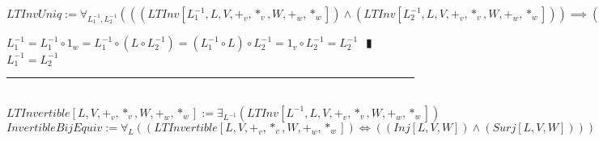 \documentclass{book}
\newcommand{\abr}{:=}
\newcommand{\pipe}{$\phantom{(}\vrectangleblack\phantom{)}$}
\begin{document}
$LTInvUniq \abr \forall_{L_1^{-1}, L_2^{-1}}(((LTInv[L_1^{-1}, L, V, +_v, *_v, W, +_w, *_w]) \land (LTInv[L_2^{-1}, L, V, +_v, *_v, W, +_w, *_w])) \implies (L_1^{-1} = L_2^{-1}))$
\begin{enumerate}
  \lit $L_1^{-1} = L_1^{-1} \circ 1_w = L_1^{-1} \circ (L \circ L_2^{-1}) = (L_1^{-1} \circ L) \circ L_2^{-1} = 1_v \circ L_2^{-1} = L_2^{-1}$ \pipe $L_1^{-1} = L_2^{-1}$
\end{enumerate} \vspace{.75mm} \hrule \vspace{.75mm} \ \\ 

$LTInvertible[L, V, +_v, *_v, W, +_w, *_w] \abr \exists_{L^{-1}}(LTInv[L^{-1}, L, V, +_v, *_v, W, +_w, *_w])$ \\

$InvertibleBijEquiv \abr \forall_{L}((LTInvertible[L, V, +_v, *_v, W, +_w, *_w]) \iff ((Inj[L, V, W]) \land (Surj[L, V, W])))$
\end{document}
